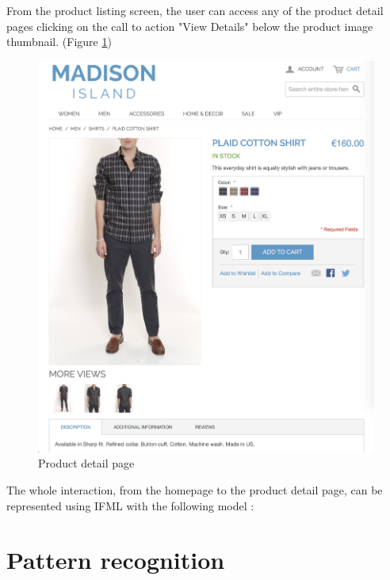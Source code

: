 From the product listing screen, the user can access any of the product detail pages clicking on the call to action "View Details" below the product image thumbnail. (Figure \ref{fig:product-detail})

\vspace{0.1cm}
\begin{figure}[htbp]
  \centering
    \includegraphics[width=12cm]{images/madison/product-detail.png}
  \caption{Product detail page}
  \label{fig:product-detail}
\end{figure}
\vspace{0.1cm}

The whole interaction, from the homepage to the product detail page, can be represented using IFML with the following model  :

















\section{Pattern recognition}



